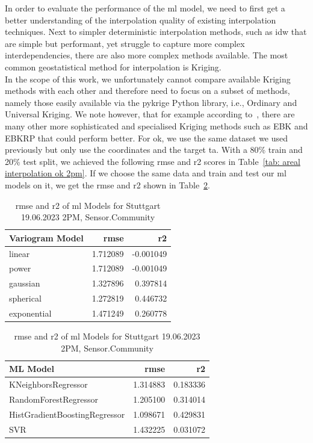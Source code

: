 In order to evaluate the performance of the \gls{ml} model, we need to first get a better understanding of the interpolation quality of existing interpolation techniques. Next to simpler deterministic interpolation methods, such as \gls{idw} that are simple but performant, yet struggle to capture more complex interdependencies, there are also more complex methods available. The most common geostatistical method for interpolation is Kriging.\\
In the scope of this work, we unfortunately cannot compare available Kriging methods with each other and therefore need to focus on a subset of methods, namely those easily available via the pykrige Python library, i.e., Ordinary and Universal Kriging. We note however, that for example according to~\cite{njoku2023effects}, there are many other more sophisticated and specialised Kriging methods such as EBK and EBKRP that could perform better. For \gls{ok}, we use the same dataset we used previously but only use the coordinates and the target \gls{ta}. With a 80\% train and 20\% test split, we achieved the following \gls{rmse} and \gls{r2} scores in Table~\ref{tab: areal interpolation ok 2pm}. If we choose the same data and train and test our \gls{ml} models on it, we get the \gls{rmse} and \gls{r2} shown in Table~\ref{tab: areal interpolation ml models 2pm}.\\

\begin{table}[ht]
  \centering
  \begin{tabular}{lrr}
  \toprule
  Variogram Model &     \gls{rmse} &        \gls{r2} \\
  \midrule
          linear & 1.712089 & -0.001049 \\
            power & 1.712089 & -0.001049 \\
        gaussian & 1.327896 &  0.397814 \\
        spherical & 1.272819 &  0.446732 \\
      exponential & 1.471249 &  0.260778 \\
  \bottomrule
  \end{tabular}
  \label{tab: areal interpolation ok 2pm}
  \caption{\gls{rmse} and \gls{r2} of Ordinary Kriging for Stuttgart 19.06.2023 2PM, Sensor.Community}

  \begin{tabular}{lrr}
  \toprule
            ML Model &     \gls{rmse} &       \gls{r2} \\
  \midrule
            KNeighborsRegressor & 1.314883 & 0.183336 \\
          RandomForestRegressor & 1.205100 & 0.314014 \\
  HistGradientBoostingRegressor & 1.098671 & 0.429831 \\
                            SVR & 1.432225 & 0.031072 \\
  \bottomrule
  \end{tabular}
  \label{tab: areal interpolation ml models 2pm}
  \caption{\gls{rmse} and \gls{r2} of \gls{ml} Models for Stuttgart 19.06.2023 2PM, Sensor.Community}
\end{table}

